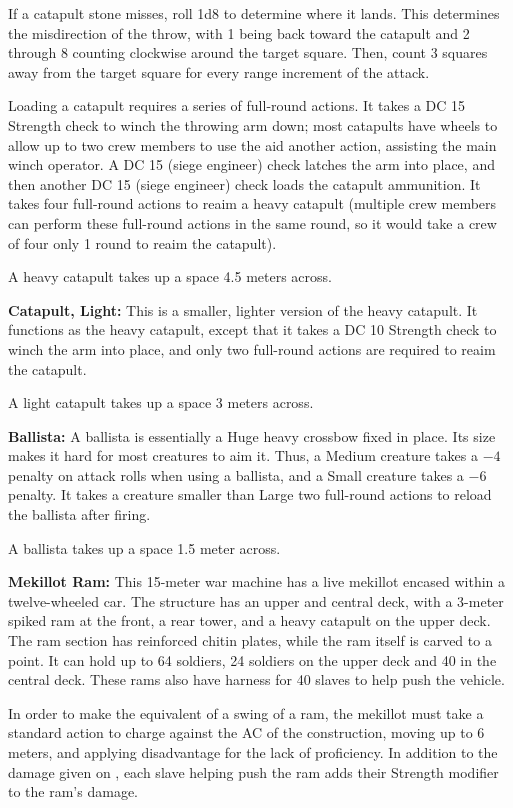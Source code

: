 If a catapult stone misses, roll 1d8 to determine where it lands. This determines the misdirection of the throw, with 1 being back toward the catapult and 2 through 8 counting clockwise around the target square. Then, count 3 squares away from the target square for every range increment of the attack.

Loading a catapult requires a series of full-round actions. It takes a DC 15 Strength check to winch the throwing arm down; most catapults have wheels to allow up to two crew members to use the aid another action, assisting the main winch operator. A DC 15  (siege engineer) check latches the arm into place, and then another DC 15  (siege engineer) check loads the catapult ammunition. It takes four full-round actions to reaim a heavy catapult (multiple crew members can perform these full-round actions in the same round, so it would take a crew of four only 1 round to reaim the catapult).

A heavy catapult takes up a space 4.5 meters across.

\textbf{Catapult, Light:} This is a smaller, lighter version of the heavy catapult. It functions as the heavy catapult, except that it takes a DC 10 Strength check to winch the arm into place, and only two full-round actions are required to reaim the catapult.

A light catapult takes up a space 3 meters across.

\textbf{Ballista:} A ballista is essentially a Huge heavy crossbow fixed in place. Its size makes it hard for most creatures to aim it. Thus, a Medium creature takes a $-4$ penalty on attack rolls when using a ballista, and a Small creature takes a $-6$ penalty. It takes a creature smaller than Large two full-round actions to reload the ballista after firing.

A ballista takes up a space 1.5 meter across.

\textbf{Mekillot Ram:} This 15-meter war machine has a live mekillot encased within a twelve-wheeled car. The structure has an upper and central deck, with a 3-meter spiked ram at the front, a rear tower, and a heavy catapult on the upper deck. The ram section has reinforced chitin plates, while the ram itself is carved to a point. It can hold up to 64 soldiers, 24 soldiers on the upper deck and 40 in the central deck. These rams also have harness for 40 slaves to help push the vehicle.

In order to make the equivalent of a swing of a ram, the mekillot must take a standard action to charge against the AC of the construction, moving up to 6 meters, and applying disadvantage for the lack of proficiency. In addition to the damage given on , each slave helping push the ram adds their Strength modifier to the ram's damage.

